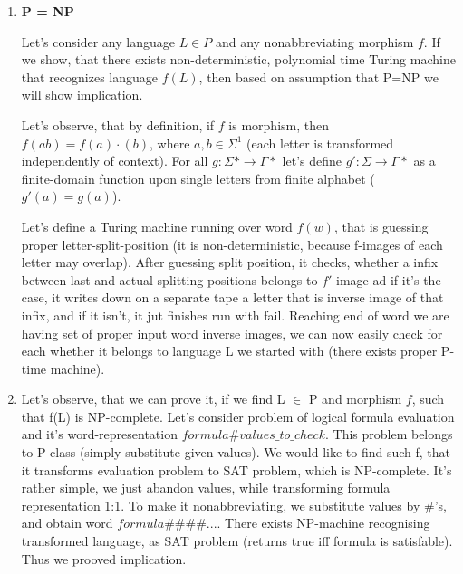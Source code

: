 \documentclass[12pt]{article}
\begin{document}
\begin{enumerate}
    \item \textbf{P = NP \Rightarrow {}}
    
        Let's consider any language $L \in P$ and any nonabbreviating morphism $f$. If we show, that there exists non-deterministic, polynomial time Turing machine that recognizes language $f(L)$, then based on assumption that P=NP we will show implication.
        
        Let's observe, that by definition, if $f$ is morphism, then $f(ab)= f(a)\cdot(b)$, where $a, b \in \Sigma^{1}$ (each letter is transformed independently of context). 
        For all $g\colon\Sigma\ast\to\Gamma\ast$ let's define $g'\colon\Sigma\to\Gamma\ast$ as a finite-domain function upon single letters from finite alphabet ($g'(a)=g(a)$).
        
        Let's define a Turing machine running over word $f(w)$, that is guessing proper letter-split-position (it is non-deterministic, because f-images of each letter may overlap). After guessing split position, it checks, whether a infix between last and actual splitting positions belongs to $f'$ image
        ad if it's the case, it writes down on a separate tape a letter that is inverse image of that infix, and if it isn't, it jut finishes run with fail.
        Reaching end of word we are having set of proper input  word inverse images, we can now easily check for each whether it belongs to language L we started with (there exists proper P-time machine).
        
    \item \textbf{ \Rightarrow  {}}
    
        Let's observe, that we can prove it, if we find L $\in$ P and morphism $f$, such that f(L) is NP-complete. Let's consider problem of logical formula evaluation and it's word-representation $formula\#values\_to\_check$. This problem belongs to P class (simply substitute given values). We would like to find such f, that it transforms evaluation problem to SAT problem, which is NP-complete. It's rather simple, we just abandon values, while transforming formula representation 1:1. To make it nonabbreviating, we substitute values by $\#$'s, and obtain word $formula\#\#\#\#...$. There exists NP-machine recognising transformed language, as SAT problem (returns true iff formula is satisfable). Thus we prooved implication.
\end{enumerate}
\end{document}
